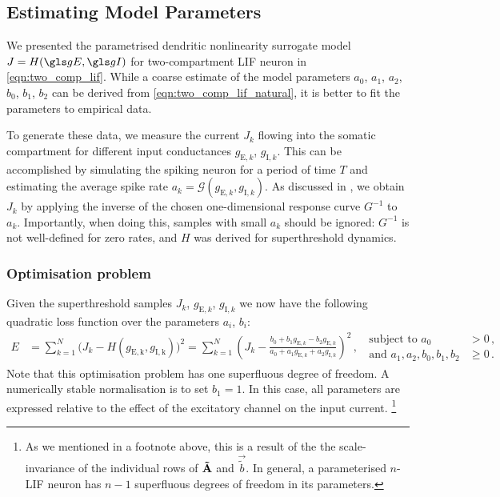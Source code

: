 \subsection{Estimating Model Parameters}
\label{sec:two_comp_lif_fit_model}

We presented the parametrised dendritic nonlinearity surrogate model $J = H(\gE, \gI)$ for two-compartment LIF neuron in \cref{eqn:two_comp_lif}.
While a coarse estimate of the model parameters $a_0$, $a_1$, $a_2$, $b_0$, $b_1$, $b_2$ can be derived from \cref{eqn:two_comp_lif_natural}, it is better to fit the parameters to empirical data.

To generate these data, we measure the current $J_k$ flowing into the somatic compartment for different input conductances $g_{\mathrm{E}, k}$, $g_{\mathrm{I}, k}$.
This can be accomplished by simulating the spiking neuron for a period of time $T$ and estimating the average spike rate $a_k = \mathscr{G}( g_{\mathrm{E}, k}, g_{\mathrm{I}, k})$.
As discussed in , we obtain $J_k$ by applying the inverse of the chosen one-dimensional response curve $G^{-1}$ to $a_k$.
Importantly, when doing this, samples with small $a_k$ should be ignored: $G^{-1}$ is not well-defined for zero rates, and $H$ was derived for superthreshold dynamics.

\subsubsection{Optimisation problem}
Given the superthreshold samples $J_k$, $g_{\mathrm{E}, k}$, $g_{\mathrm{I}, k}$ we now have the following quadratic loss function over the parameters $a_i$, $b_i$:
\begin{align}
	E &=
		\sum_{k = 1}^N \bigl( J_k - H(g_\mathrm{E, k}, g_\mathrm{I, k}) \bigr)^2
	= \sum_{k = 1}^N \left( \! J_k - \frac{b_0 + b_1 g_{\mathrm{E}, k} - b_2 g_{\mathrm{E}, k}}{a_0 + a_1 g_{\mathrm{E}, k} + a_2  g_{\mathrm{I}, k}} \right)^2 \,,
	\;\; \begin{aligned}\text{subject to } a_0 &> 0 \,, \\ \text{and } a_1, a_2, b_0, b_1, b_2 &\geq  0 \,.\end{aligned}
	\label{eqn:two_comp_optimal_parameters}
\end{align}
Note that this optimisation problem has one superfluous degree of freedom.
A numerically stable normalisation is to set $b_1 = 1$.
In this case, all parameters are expressed relative to the effect of the excitatory channel on the input current.%
\footnote{As we mentioned in a footnote above, this is a result of the the scale-invariance of the individual rows of $\mathbf{\tilde A}$ and $\vec{\tilde b}$. In general, a parameterised $n$-LIF neuron has $n - 1$ superfluous degrees of freedom in its parameters.}

